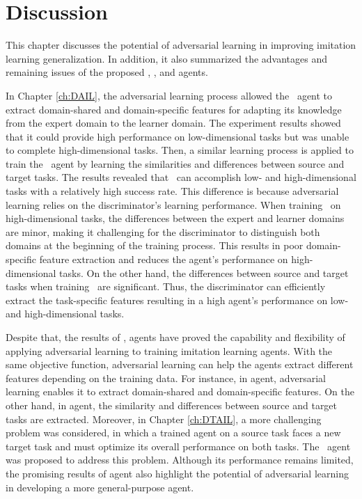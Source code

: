 \chapter{Discussion\label{ch:Discussion}}


\renewcommand{\SectionsDir}{Chapter6/Sections}
\renewcommand{\SubsectionsDir}{Chapter6/Sections/Subsections}
\renewcommand{\FigsDir}{Chapter6/Figs}
\renewcommand{\TablesDir}{Chapter6/Tables}


This chapter discusses the potential of adversarial learning in improving imitation learning generalization.
In addition, it also summarized the advantages and remaining issues of the proposed \DAIL{}, \TAIL{}, and \DTAIL{} agents.


In Chapter \ref{ch:DAIL}, the adversarial learning process allowed the \DAIL\ agent to extract domain-shared and domain-specific features for adapting its knowledge from the expert domain to the learner domain.
The experiment results showed that it could provide high performance on low-dimensional tasks but was unable to complete high-dimensional tasks.
Then, a similar learning process is applied to train the \TAIL\ agent by learning the similarities and differences between source and target tasks.
The results revealed that \TAIL\ can accomplish low- and high-dimensional tasks with a relatively high success rate.
This difference is because adversarial learning relies on the discriminator's learning performance.
When training \DAIL\ on high-dimensional tasks, the differences between the expert and learner domains are minor, making it challenging for the discriminator to distinguish both domains at the beginning of the training process.
This results in poor domain-specific feature extraction and reduces the agent's performance on high-dimensional tasks.
On the other hand, the differences between source and target tasks when training \TAIL\ are significant.
Thus, the discriminator can efficiently extract the task-specific features resulting in a high agent's performance on low- and high-dimensional tasks.

Despite that, the results of \DAIL{}, \TAIL{} agents have proved the capability and flexibility of applying adversarial learning to training imitation learning agents.
With the same objective function, adversarial learning can help the agents extract different features depending on the training data.
For instance, in \DAIL{} agent, adversarial learning enables it to extract domain-shared and domain-specific features.
On the other hand, in \TAIL{} agent, the similarity and differences between source and target tasks are extracted.
Moreover, in Chapter \ref{ch:DTAIL}, a more challenging problem was considered, in which a trained agent on a source task faces a new target task and must optimize its overall performance on both tasks.
The \DTAIL\ agent was proposed to address this problem.
Although its performance remains limited,
the promising results of \DTAIL{} agent also highlight the potential of adversarial learning in developing a more general-purpose agent.

